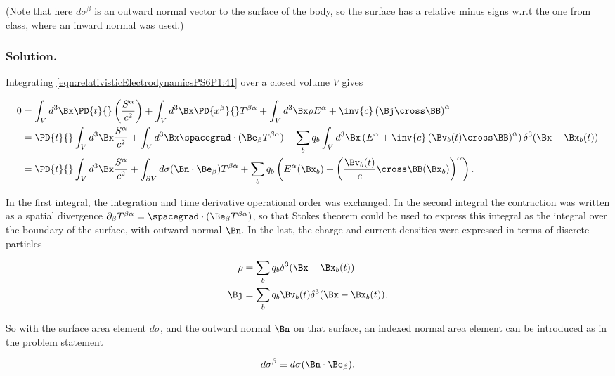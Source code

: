 (Note that here $d \sigma^\beta$ is an outward normal vector to the surface of the body, so the surface has a relative minus signs w.r.t the one from class, where an inward normal was used.)

\subsubsection{Solution.}

Integrating \ref{eqn:relativisticElectrodynamicsPS6P1:41} over a closed volume $V$ gives

\begin{align*}
0 
&=
\int_V d^3 \Bx \PD{t}{}\left( \frac{S^\alpha}{c^2} \right) 
+ 
\int_V d^3 \Bx \PD{x^\beta}{} T^{\beta \alpha} 
+
\int_V d^3 \Bx \rho E^\alpha + \inv{c} \left( \Bj \cross \BB \right)^\alpha  \\
&=
\PD{t}{} \int_V d^3 \Bx \frac{S^\alpha}{c^2} 
+ 
\int_V d^3 \Bx \spacegrad \cdot (\Be_\beta T^{\beta \alpha})
+
\sum_b q_b \int_V d^3 \Bx \left( E^\alpha + \inv{c} \left( \Bv_b(t) \cross \BB \right)^\alpha \right) \delta^3(\Bx - \Bx_b(t)) \\
&=
\PD{t}{} \int_V d^3 \Bx \frac{S^\alpha}{c^2} 
+ 
\int_{\partial V} d \sigma (\Bn \cdot \Be_\beta) T^{\beta \alpha}
+
\sum_b q_b \left( E^\alpha(\Bx_b) + \left( \frac{\Bv_b(t)}{c} \cross \BB(\Bx_b) \right)^\alpha \right).
\end{align*}

In the first integral, the integration and time derivative operational order was exchanged.  In the second integral the contraction was written as a spatial divergence $\partial_\beta T^{\beta \alpha} = \spacegrad \cdot (\Be_\beta T^{\beta \alpha})$, so that Stokes theorem could be used to express this integral as the integral over the boundary of the surface, with outward normal $\Bn$.  In the last, the charge and current densities were expressed in terms of discrete particles

\begin{align}\label{eqn:relativisticElectrodynamicsPS6P1:230}
\rho &= \sum_b q_b \delta^3(\Bx - \Bx_b(t)) \\
\Bj &= \sum_b q_b \Bv_b(t) \delta^3(\Bx - \Bx_b(t)).
\end{align}

So with the surface area element $d \sigma$, and the outward normal $\Bn$ on that surface, an indexed normal area element can be introduced as in the problem statement

\begin{equation}\label{eqn:relativisticElectrodynamicsPS6P1:250}
d \sigma^\beta \equiv d \sigma (\Bn \cdot \Be_\beta).
\end{equation}


